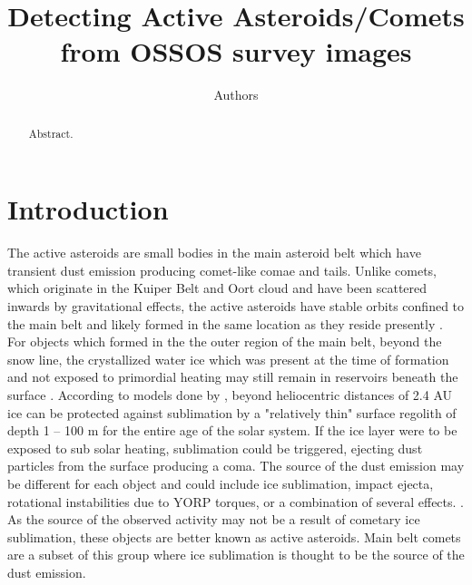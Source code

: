 \documentclass[iop,apj]{emulateapj}
\begin{document}
\title{Detecting Active Asteroids/Comets from OSSOS survey images}
\author{Authors}

\begin{abstract}
Abstract.
\end{abstract}

\maketitle

\section{Introduction}

The active asteroids are small bodies in the main asteroid belt which have transient dust emission producing comet-like comae and tails. Unlike comets, which originate in the Kuiper Belt and Oort cloud and have been scattered inwards by gravitational effects, the active asteroids have  stable orbits confined to the main belt and likely formed in the same location as they reside presently \citep{sheppard14}. For objects which formed in the the outer region of the main belt, beyond the snow line, the crystallized water ice which was present at the time of formation and not exposed to primordial heating may still remain in reservoirs beneath the surface \citep{sonnett11}.  According to models done by \citet*{fanale89},  beyond heliocentric distances of 2.4 AU ice can be protected against sublimation by a "relatively thin" surface regolith  of depth 1 -- 100 m for the entire age of the solar system. If the ice layer were to be exposed to sub solar heating,  sublimation could be triggered,  ejecting dust particles from the surface producing a coma.  %
The source of the dust emission may be different for each object and could include ice sublimation, impact ejecta, rotational instabilities due to YORP torques, or a combination of several effects. \citep{hsieh15}. %
As the source of the observed activity may not be a result of cometary ice sublimation, these objects are better known as active asteroids. Main belt comets are a subset of this group where ice sublimation is thought to be the source of the dust emission. 
\end{document}
